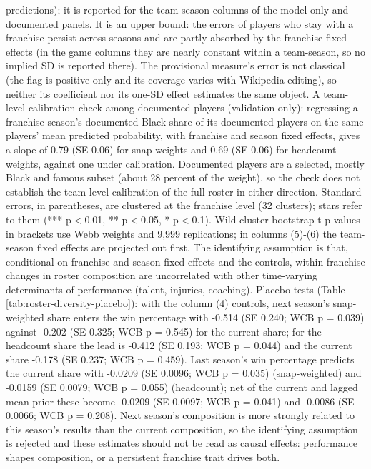 {predictions); it is reported for the team-season columns of the model-only and documented panels. It is an upper bound: the errors of players who stay with a franchise persist across seasons and are partly absorbed by the franchise fixed effects (in the game columns they are nearly constant within a team-season, so no implied SD is reported there). The provisional measure's error is not classical (the flag is positive-only and its coverage varies with Wikipedia editing), so neither its coefficient nor its one-SD effect estimates the same object. A team-level calibration check among documented players (validation only): regressing a franchise-season's documented Black share of its documented players on the same players' mean predicted probability, with franchise and season fixed effects, gives a slope of 0.79 (SE 0.06) for snap weights and  0.69 (SE 0.06) for headcount weights, against one under calibration. Documented players are a selected, mostly Black and famous subset (about 28 percent of the weight), so the check does not establish the team-level calibration of the full roster in either direction. Standard errors, in parentheses, are clustered at the franchise level (32 clusters); stars refer to them (*** p$<$0.01, ** p$<$0.05, * p$<$0.1). Wild cluster bootstrap-t p-values in brackets use Webb weights and 9,999 replications; in columns (5)-(6) the team-season fixed effects are projected out first. The identifying assumption is that, conditional on franchise and season fixed effects and the controls, within-franchise changes in roster composition are uncorrelated with other time-varying determinants of performance (talent, injuries, coaching). Placebo tests (Table \ref{tab:roster-diversity-placebo}): with the column (4) controls, next season's snap-weighted share enters the win percentage with -0.514 (SE 0.240; WCB p = 0.039) against -0.202 (SE 0.325; WCB p = 0.545) for the current share; for the headcount share the lead is -0.412 (SE 0.193; WCB p = 0.044) and the current share -0.178 (SE 0.237; WCB p = 0.459). Last season's win percentage predicts the current share with -0.0209 (SE 0.0096; WCB p = 0.035) (snap-weighted) and -0.0159 (SE 0.0079; WCB p = 0.055) (headcount); net of the current and lagged mean prior these become -0.0209 (SE 0.0097; WCB p = 0.041) and -0.0086 (SE 0.0066; WCB p = 0.208). Next season's composition is more strongly related to this season's results than the current composition, so the identifying assumption is rejected and these estimates should not be read as causal effects: performance shapes composition, or a persistent franchise trait drives both.
\par}

